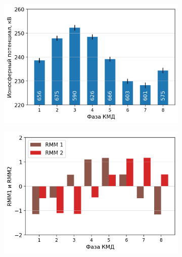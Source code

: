 \begin{figure} 
    \centering
    \begin{subfigure}[tb]{.49\textwidth}
		\centering
		\includegraphics[width=\textwidth]{figures/ip_vs_mjo_phase.png}
		\caption{}
		\label{fig:ip_vs_mjo_phase}
	\end{subfigure}
    \hfill
    \begin{subfigure}[tb]{.49\textwidth}
		\centering
		\includegraphics[width=\textwidth]{figures/rmm_vs_mjo_phase.png}
		\caption{}
		\label{fig:rmm_vs_mjo_phase}
	\end{subfigure}
	\\
	\begin{subfigure}[tb]{.49\textwidth}
		\centering

\end{subfigure}
\end{figure}
